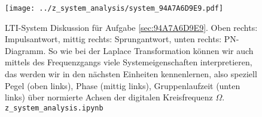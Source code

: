\begin{figure}
\texttt{[image: ../z\_system\_analysis/system\_94A7A6D9E9.pdf]}
\caption{LTI-System Diskussion für Aufgabe \ref{sec:94A7A6D9E9}.
Oben rechts: Impulsantwort, mittig rechts: Sprungantwort,
unten rechts: PN-Diagramm. So wie bei der Laplace
Transformation können wir auch mittels des Frequenzgangs viele Systemeigenschaften
interpretieren, das werden wir in den nächsten Einheiten kennenlernen, also
speziell Pegel (oben links), Phase (mittig links), Gruppenlaufzeit
(unten links) über normierte Achsen der digitalen Kreisfrequenz $\Omega$.
%
\texttt{z\_system\_analysis.ipynb}
}
\label{fig:94A7A6D9E9}
\end{figure}
